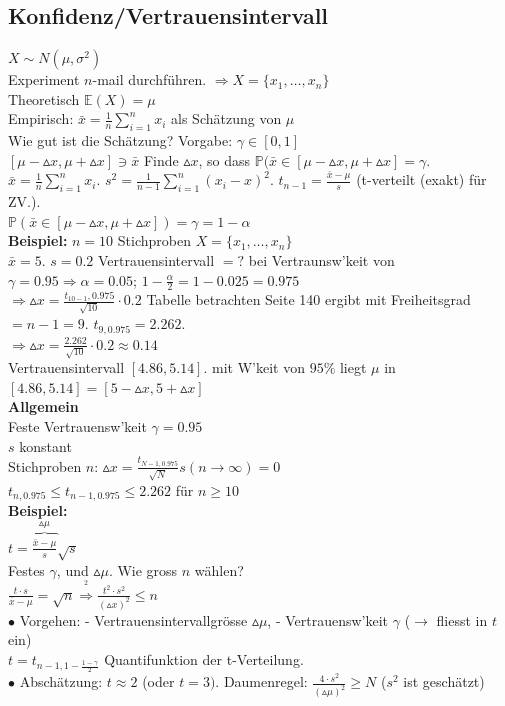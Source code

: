\documentclass[a4paper,10pt]{article}
\newcommand{\EN}{\mathbb{E}}
\newcommand{\Bold}[1]{\textbf{#1}} %
\newcommand{\Ra}{\Rightarrow}
\newcommand{\Sumone}[2]{\sum_{#2=1}^{#1}} %
\newcommand{\Oneover}[1]{\frac{1}{#1}} %
\newcommand{\Oben}[2]{\overset{#1}{#2}} %
\begin{document}
\subsection{Konfidenz/Vertrauensintervall}
$X\sim N(\mu,\sigma^2)$\\
Experiment $n$-mail durchführen. $\Ra X=\{x_1,\dots,x_n\}$\\
Theoretisch $\EN(X)=\mu$\\
Empirisch: $\bar{x}=\Oneover{n}\Sumone{n}{i}x_i$ als Schätzung von $\mu$\\
Wie gut ist die Schätzung? Vorgabe: $\gamma\in[0,1]$\\ $[\mu-\vartriangle x,\mu+\vartriangle x]\ni \bar{x}$ Finde $\vartriangle x$, so dass $\mathbb{P}(\bar{x}\in[\mu-\vartriangle x,\mu+\vartriangle x]=\gamma$.\\
$\bar{x}=\Oneover{n}\Sumone{n}{i}x_i$. $s^2=\Oneover{n-1}\Sumone{n}{i}(x_i-x)^2$. $t_{n-1}=\frac{\bar{x}-\mu}{s}$ (t-verteilt (exakt) für ZV.).\\
$\mathbb{P}(\bar{x}\in[\mu-\vartriangle x,\mu+\vartriangle x])=\gamma=1-\alpha$\\
\Bold{Beispiel:}
$n=10$ Stichproben $X=\{x_1,\dots,x_n\}$\\
$\bar{x}=5$. $s=0.2$ Vertrauensintervall $=?$ bei Vertraunsw'keit von $\gamma=0.95\Ra \alpha=0.05$; $1-\frac{\alpha}{2}=1-0.025=0.975$\\
$\Ra\vartriangle x=\frac{t_{10-1},0.975}{\sqrt{10}}\cdot 0.2$ Tabelle betrachten Seite 140 ergibt mit Freiheitsgrad $=n-1=9$. $t_{9,0.975}=2.262$.\\
$\Ra \vartriangle x=\frac{2.262}{\sqrt{10}}\cdot 0.2\approx 0.14$\\
Vertrauensintervall $[4.86, 5.14]$. mit W'keit von $95\%$ liegt $\mu$ in $[4.86, 5.14] = [5-\vartriangle x, 5+\vartriangle x]$\\
\Bold{Allgemein}\\
Feste Vertrauensw'keit $\gamma=0.95$\\
$s$ konstant\\
Stichproben $n$: $\vartriangle x=\frac{t_{N-1,0.975}}{\sqrt{N}}s (n\to\infty)=0$\\
$t_{n,0.975}\leq t_{n-1,0.975}\leq2.262$ für $n\geq10$\\
\Bold{Beispiel:}\\
$t=\overbrace{\frac{\bar{x}-\mu}{s}}^{\vartriangle\mu}\sqrt{s}$\\
Festes $\gamma$, und $\vartriangle\mu$. Wie gross $n$ wählen?\\
$\frac{t\cdot s}{\bar{x}-\mu}=\sqrt{n}\Oben{^2}{\Ra}\frac{t^2\cdot s^2}{(\vartriangle x)^2}\leq n$\\
$\bullet$ Vorgehen: - Vertrauensintervallgrösse $\vartriangle\mu$, - Vertrauensw'keit $\gamma$ ($\to$ fliesst in $t$ ein)\\
$t=t_{n-1,1-\frac{1-\gamma}{2}}$ Quantifunktion der t-Verteilung.\\
$\bullet$ Abschätzung: $t\approx 2$ (oder $t=3)$. Daumenregel: $\frac{4\cdot s^2}{(\vartriangle\mu)^2}\geq N$ ($s^2$ ist geschätzt)
\end{document}
